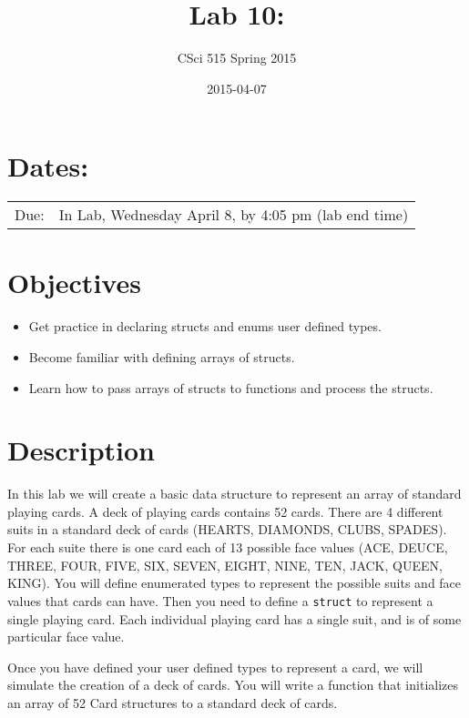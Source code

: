 \documentclass[11pt]{article}
\title{Lab 10:}
\author{CSci 515 Spring 2015}
\date{2015-04-07}
\begin{document}
\maketitle


\section*{Dates:}
\label{sec-1}


\begin{center}
\begin{tabular}{ll}
 Due:  &  In Lab, Wednesday April 8, by 4:05 pm (lab end time)  \\
\end{tabular}
\end{center}
\section*{Objectives}
\label{sec-2}

\begin{itemize}
\item Get practice in declaring structs and enums user defined
  types.
\item Become familiar with defining arrays of structs.
\item Learn how to pass arrays of structs to functions and process
  the structs.
\end{itemize}
\section*{Description}
\label{sec-3}

In this lab we will create a basic data structure to represent
an array of standard playing cards.  A deck of playing
cards contains 52 cards.  There are 4 different suits
in a standard deck of cards (HEARTS, DIAMONDS, CLUBS, SPADES).
For each suite there is one card each of 13 possible face
values (ACE, DEUCE, THREE, FOUR, FIVE, SIX, SEVEN, EIGHT, NINE,
TEN, JACK, QUEEN, KING).  You will define enumerated types
to represent the possible suits and face values that cards
can have.  Then you need to define a \verb~struct~ to represent
a single playing card. Each individual playing card has
a single suit, and is of some particular face value.

Once you have defined your user defined types to represent a card, we
will simulate the creation of a deck of cards.  You will write a
function that initializes an array of 52 Card structures to a standard
deck of cards.
\end{document}
